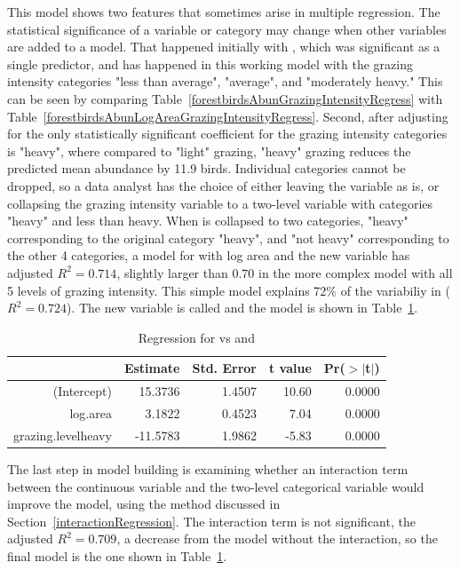 This model shows two features that sometimes arise in multiple regression.  The statistical significance of a variable or category may change when other variables are added to a model. That happened initially with , which was significant as a single predictor, and has happened in this working model with the grazing intensity categories "less than average", "average", and "moderately heavy."  This can be seen by comparing Table~\ref{forestbirdsAbunGrazingIntensityRegress} with Table~\ref{forestbirdsAbunLogAreaGrazingIntensityRegress}.  Second, after adjusting for  the only statistically significant coefficient for the grazing intensity categories is "heavy", where compared to "light" grazing, "heavy" grazing reduces the predicted mean abundance by 11.9 birds.     Individual categories cannot be dropped, so a data analyst has the choice of either leaving the variable as is, or collapsing the grazing intensity variable to a two-level variable with categories "heavy" and less than heavy. When  is collapsed to two categories, "heavy" corresponding to the original category "heavy", and "not heavy" corresponding to the other 4 categories, a model for  with log area and the new variable has  adjusted $R^2 = 0.714$, slightly larger than $0.70$ in the more complex model with all 5 levels of grazing intensity. This simple model explains 72\% of the variabiliy in  ($R^2 = 0.724$). The new variable is called  and the model is shown in Table~\ref{forestbirdsAbunLogAreaGrazingLevelRegress}.

\begin{table}[ht]
\centering
\begin{tabular}{rrrrr}
  \hline
 & Estimate & Std. Error & t value & Pr($>$$|$t$|$) \\ 
  \hline
(Intercept) & 15.3736 & 1.4507 & 10.60 & 0.0000 \\ 
  log.area & 3.1822 & 0.4523 & 7.04 & 0.0000 \\ 
  grazing.levelheavy & -11.5783 & 1.9862 & -5.83 & 0.0000 \\ 
   \hline
\end{tabular}
\caption{Regression for  vs  and }
\label{forestbirdsAbunLogAreaGrazingLevelRegress}
\end{table}

The last step in model building is examining whether an interaction term between the continuous variable  and the two-level categorical variable  would improve the model, using the method discussed in Section~\ref{interactionRegression}.  The interaction term is not significant, the adjusted $R^2 = 0.709$, a decrease from the model without the interaction, so the final model is the one shown in Table~\ref{forestbirdsAbunLogAreaGrazingLevelRegress}.

